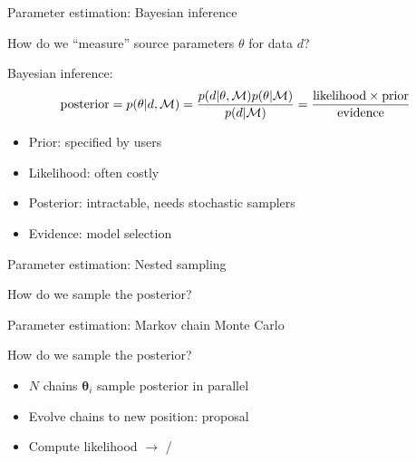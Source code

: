 \documentclass[usenames,dvipsnames,t]{beamer}
\newcommand{\boldtheta}{\boldsymbol{\theta}}
\newcommand{\incfig}[2][0.75\textwidth]{%
    \def\svgwidth{\columnwidth}
    \resizebox{#1}{!}{{#2.pdf_tex}}
}
\begin{document}
\begin{frame}{Parameter estimation: Bayesian inference}

  \def\x{3mm}

  How do we ``measure'' source parameters $\theta$ for data $d$? 

  \vspace{\x}
  
  Bayesian inference:
  \begin{equation*}
    {\rm{posterior}} = p(\theta|d, \mathcal{M}) = \frac{p(d|\theta, \mathcal{M}) p(\theta | \mathcal{M})}{p(d | \mathcal{M})} = \frac{\rm{likelihood} \times \rm{prior}}{\rm{evidence}}
  \end{equation*}

  \begin{itemize}
    \item Prior: specified by users
    
    \item Likelihood: often costly
    
    \item Posterior: intractable, needs stochastic samplers

    \item Evidence: model selection
  \end{itemize}
\end{frame}

\begin{frame}{Parameter estimation: Nested sampling}

  \def\x{3mm}

  How do we sample the posterior? 

\end{frame}

\begin{frame}{Parameter estimation: Markov chain Monte Carlo}

  \def\x{3mm}

  How do we sample the posterior? 

  \begin{itemize}
    \item $N$ chains $\boldtheta_i$ sample posterior in parallel
    
    \item Evolve chains to new position: proposal 
    
    \item Compute likelihood $\rightarrow$ /
  \end{itemize}

  \vspace{\x}

  \centering
  \incfig[0.9\textwidth]{sampling}
\end{frame}
\end{document}
